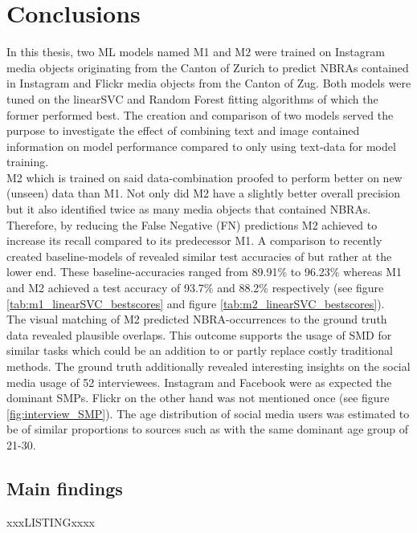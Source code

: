 \chapter{Conclusions} \label{conclusion_outlook}

In this thesis, two ML models named M1 and M2 were trained on Instagram media objects originating from the Canton of Zurich to predict NBRAs contained in Instagram and Flickr media objects from the Canton of Zug. Both models were tuned on the linearSVC and Random Forest fitting algorithms of which the former performed best. The creation and comparison of two models served the purpose to investigate the effect of combining text and image contained information on model performance compared to only using text-data for model training.\\
M2 which is trained on said data-combination proofed to perform better on new (unseen) data than M1. Not only did M2 have a slightly better overall precision but it also identified twice as many media objects that contained NBRAs. Therefore, by reducing the False Negative (FN) predictions M2 achieved to increase its recall compared to its predecessor M1. A comparison to recently created baseline-models of \parencite{Das2018, Li2018} revealed similar test accuracies of but rather at the lower end. These baseline-accuracies ranged from 89.91\% to 96.23\% whereas M1 and M2 achieved a test accuracy of 93.7\% and 88.2\% respectively (see figure \ref{tab:m1_linearSVC_bestscores} and figure \ref{tab:m2_linearSVC_bestscores}).\\
The visual matching of M2 predicted NBRA-occurrences to the ground truth data revealed plausible overlaps. This outcome supports the usage of SMD for similar tasks which could be an addition to or partly replace costly traditional methods. The ground truth additionally revealed interesting insights on the social media usage of 52 interviewees. Instagram and Facebook were as expected the dominant SMPs. Flickr on the other hand was not mentioned once (see figure \ref{fig:interview_SMP}). The age distribution of social media users was estimated to be of similar proportions  to sources such as \parencite{2013} with the same dominant age group of 21-30.

\section{Main findings}

xxxLISTINGxxxx

